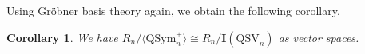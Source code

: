 \documentclass[submission]{FPSAC2024}
\newtheorem{cor}[equation]{Corollary}
\theoremstyle{definition}
\theoremstyle{remark}
\newtheorem{rem}[equation]{Remark}
\numberwithin{equation}{section}
\newcommand{\QSym}{\mathrm{QSym}}
\newcommand{\QSV}{\mathrm{QSV}}
\begin{document}
%

Using Gr\"{o}bner basis theory again, we obtain the following corollary.

\begin{cor}
We have $R_n\big/\langle \QSym_{n}^{+} \rangle \cong R_n\big/\mathbf{I}(\QSV_{n})$ as vector spaces.
\end{cor}

\end{document}
